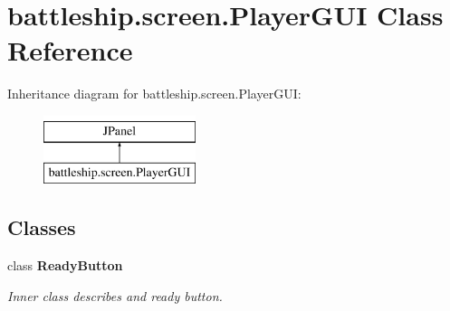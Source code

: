 \hypertarget{classbattleship_1_1screen_1_1PlayerGUI}{}\section{battleship.\+screen.\+Player\+G\+U\+I Class Reference}
\label{classbattleship_1_1screen_1_1PlayerGUI}
Inheritance diagram for battleship.\+screen.\+Player\+G\+U\+I\+:\begin{figure}[H]
\begin{center}
\leavevmode
\includegraphics[height=2.000000cm]{classbattleship_1_1screen_1_1PlayerGUI}
\end{center}
\end{figure}
\subsection*{Classes}
\begin{DoxyCompactItemize}
\item 
class {\bfseries Ready\+Button}
\begin{DoxyCompactList}\small\item\em Inner class describes and ready button. \end{DoxyCompactList}\end{DoxyCompactItemize}
